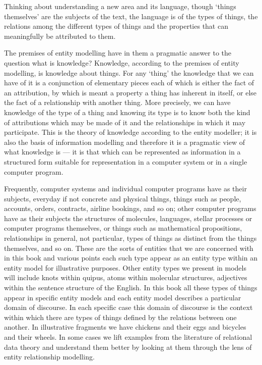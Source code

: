 Thinking about understanding a new area and its language, though ‘things themselves’ are the subjects of the text, the language is of the types of things, the relations among the different types of things and the properties that can meaningfully be attributed to them. 

The premises of entity modelling have in them a pragmatic answer to the question what is knowledge? Knowledge, according to the premises of entity modelling, is knowledge about things. For any ‘thing’ the knowledge that we can have of it is a conjunction of elementary pieces each of which is either the fact of an attribution, by which is meant a property a thing has inherent in itself, or else the fact of a relationship with another thing. More precisely, we can have knowledge of the type of a thing and knowing its type is to know both the kind of attributions which may be made of it and the relationships in which it may participate. This is the theory of knowledge according to the entity modeller; it is also the basis of information modelling and therefore it is a pragmatic view of what knowledge is — it is that which can be represented as information in a structured form suitable for representation in a computer system or in a single computer program.

Frequently, computer systems and individual computer programs have as their subjects, everyday if not concrete and physical things, things such as people, accounts, orders, contracts, airline bookings, and so on; other computer programs have as their subjects the structures of molecules, languages, stellar processes or computer programs themselves, or things such as mathematical propositions, relationships in general, not particular, types of things as distinct from the things themselves, and so on. These are the sorts of entities that we are concerned with in this book and various points each such type appear as an entity type within an entity model for illustrative purposes. Other entity types we present in models will include knots within quipus, atoms within molecular structures, adjectives within the sentence structure of the English. In this book all these types of things appear in specific entity models and each entity model describes a particular domain of discourse. 
In each specific case this domain of discourse is the context within which there are types of things defined by the relations between one another. In illustrative fragments we have chickens and their eggs and bicycles and their wheels. In some cases we lift examples from the literature of relational data theory and understand them better by looking at them through the lens of entity relationship modelling.



